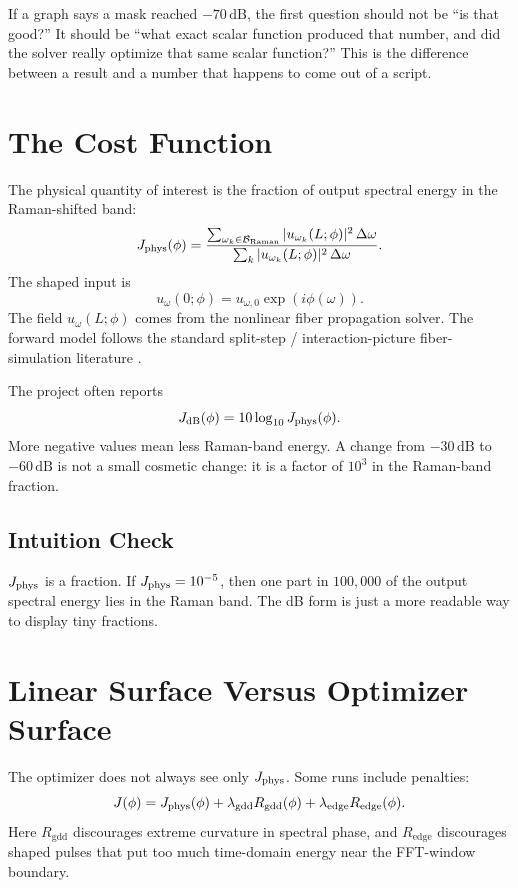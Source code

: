 \documentclass[11pt]{article}
\begin{document}
If a graph says a mask reached \(-70\,\mathrm{dB}\), the first question should
not be ``is that good?'' It should be ``what exact scalar function produced
that number, and did the solver really optimize that same scalar function?''
This is the difference between a result and a number that happens to come out
of a script.

\section{The Cost Function}

The physical quantity of interest is the fraction of output spectral energy in
the Raman-shifted band:
\[
    J_{\mathrm{phys}}(\phi)
    =
    \frac{
        \sum_{\omega_k\in\mathcal{B}_{\mathrm{Raman}}} |u_{\omega_k}(L;\phi)|^2\,\Delta\omega
    }{
        \sum_k |u_{\omega_k}(L;\phi)|^2\,\Delta\omega
    }.
\]
The shaped input is
\[
    u_\omega(0;\phi)=u_{\omega,0}\exp(i\phi(\omega)).
\]
The field \(u_\omega(L;\phi)\) comes from the nonlinear fiber propagation
solver. The forward model follows the standard split-step / interaction-picture
fiber-simulation literature \cite{agrawal2019,dudley2006,hult2007}.

The project often reports
\[
    J_{\mathrm{dB}}(\phi)=10\log_{10}J_{\mathrm{phys}}(\phi).
\]
More negative values mean less Raman-band energy. A change from
\(-30\,\mathrm{dB}\) to \(-60\,\mathrm{dB}\) is not a small cosmetic change:
it is a factor of \(10^3\) in the Raman-band fraction.

\subsection*{Intuition Check}

\(J_{\mathrm{phys}}\) is a fraction. If \(J_{\mathrm{phys}}=10^{-5}\), then one part in \(100{,}000\)
of the output spectral energy lies in the Raman band. The dB form is just a
more readable way to display tiny fractions.

\section{Linear Surface Versus Optimizer Surface}

The optimizer does not always see only \(J_{\mathrm{phys}}\). Some runs include penalties:
\[
    J(\phi)
    =
    J_{\mathrm{phys}}(\phi)
    +\lambda_{\mathrm{gdd}}R_{\mathrm{gdd}}(\phi)
    +\lambda_{\mathrm{edge}}R_{\mathrm{edge}}(\phi).
\]
Here \(R_{\mathrm{gdd}}\) discourages extreme curvature in spectral phase, and
\(R_{\mathrm{edge}}\) discourages shaped pulses that put too much time-domain
energy near the FFT-window boundary.
\end{document}
